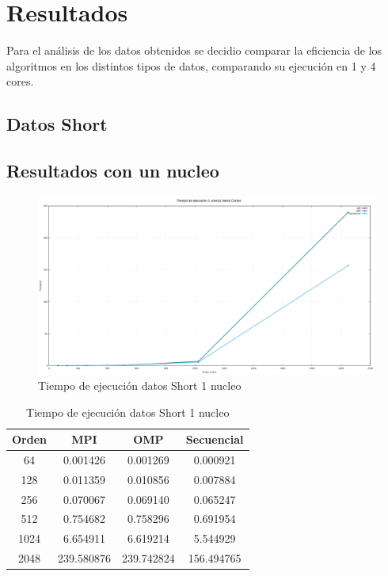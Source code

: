 \documentclass[10pt]{IEEEtran}
\begin{document}
\section{Resultados}

Para el análisis de los datos obtenidos se decidio comparar la eficiencia de los algoritmos en los distintos tipos de datos, comparando su ejecución en 1 y 4 cores.

\subsection{Datos Short}

\subsection{Resultados con un nucleo}

\begin{figure}[H]
  \centering
  \includegraphics[width=0.95\linewidth]{figs/1nucleoCortosTiempo.png}
  \caption{Tiempo de ejecución datos Short 1 nucleo}
  \label{fig:cor}
\end{figure}

\begin{table}[H]
  \caption{Tiempo de ejecución datos Short 1 nucleo}
  \label{table_example}
  \centering
  \begin{tabular}{|c|c|c|c|}
    \hline
    \textbf{Orden} & \textbf{MPI} & \textbf{OMP} & \textbf{Secuencial} \\
    \hline
    64 & 0.001426 & 0.001269 & 0.000921 \\
    128 & 0.011359 & 0.010856 & 0.007884 \\
    256 & 0.070067 & 0.069140 & 0.065247 \\
    512 & 0.754682 & 0.758296 & 0.691954 \\
    1024 & 6.654911 & 6.619214 & 5.544929 \\
    2048 & 239.580876 & 239.742824 & 156.494765 \\
    \hline
  \end{tabular}
\end{table}
\end{document}
